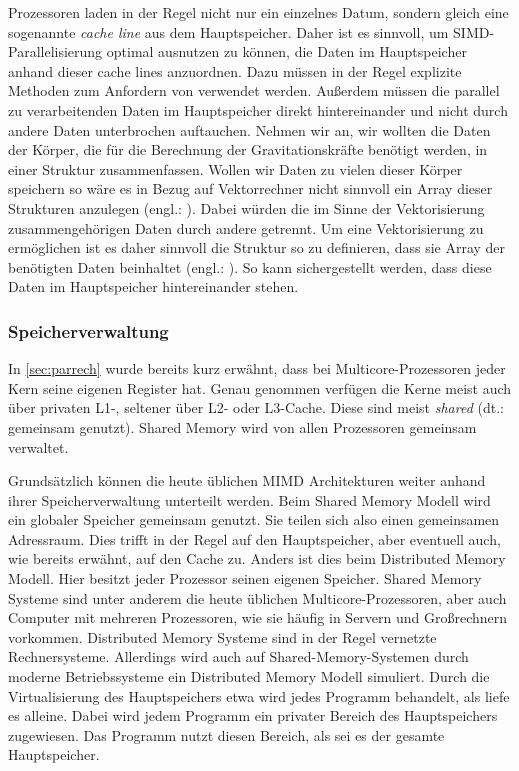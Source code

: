       Prozessoren laden in der Regel nicht nur ein einzelnes Datum, sondern gleich eine sogenannte  \textit{cache line} aus dem Hauptspeicher. Daher ist es sinnvoll, um SIMD-Parallelisierung 
      optimal ausnutzen zu können, die Daten im Hauptspeicher anhand dieser cache lines anzuordnen. Dazu müssen in der Regel explizite Methoden zum Anfordern von 
       verwendet werden. Außerdem müssen die parallel zu verarbeitenden Daten im Hauptspeicher direkt hintereinander und nicht durch andere Daten 
      unterbrochen auftauchen. Nehmen wir an, wir wollten die Daten der Körper, die für die Berechnung der Gravitationskräfte benötigt werden, in einer Struktur zusammenfassen. Wollen wir
      Daten zu vielen dieser Körper speichern so wäre es in Bezug auf Vektorrechner nicht sinnvoll ein Array dieser Strukturen anzulegen (engl.: ).
      Dabei würden die im Sinne der Vektorisierung zusammengehörigen Daten durch andere getrennt. Um eine Vektorisierung zu ermöglichen ist es daher sinnvoll die Struktur so zu definieren,
      dass sie Array der benötigten Daten beinhaltet (engl.: ). So kann sichergestellt werden, dass diese Daten im Hauptspeicher hintereinander stehen.
      
      
      \subsubsection{Speicherverwaltung}
      \label{sec:speicher}
	In \autoref{sec:parrech} wurde bereits kurz erwähnt, dass bei Multicore-Prozessoren jeder Kern seine eigenen Register hat. Genau genommen verfügen die Kerne meist auch über privaten L1-,
	seltener über L2- oder L3-Cache. Diese sind meist \textit{shared} (dt.: gemeinsam genutzt).
	Shared Memory wird von allen Prozessoren gemeinsam verwaltet.
	
	Grundsätzlich können die heute üblichen MIMD Architekturen weiter anhand ihrer Speicherverwaltung unterteilt werden. Beim Shared Memory Modell wird ein globaler
	Speicher gemeinsam genutzt. Sie teilen sich also einen gemeinsamen Adressraum. Dies trifft in der Regel auf den Hauptspeicher, aber eventuell auch, wie bereits erwähnt, auf den Cache zu.
	Anders ist dies beim Distributed Memory Modell. Hier besitzt jeder Prozessor seinen eigenen Speicher. Shared Memory Systeme sind unter anderem die heute üblichen Multicore-Prozessoren,
	aber auch Computer mit mehreren Prozessoren, wie sie häufig in Servern und Großrechnern vorkommen. Distributed Memory Systeme sind in der Regel vernetzte Rechnersysteme. Allerdings wird
	auch auf Shared-Memory-Systemen durch moderne Betriebssysteme ein Distributed Memory Modell simuliert. Durch die Virtualisierung des Hauptspeichers etwa wird jedes Programm behandelt,
	als liefe es alleine. Dabei wird jedem Programm ein privater Bereich des Hauptspeichers zugewiesen. Das Programm nutzt diesen Bereich, als sei es der gesamte Hauptspeicher. \citep{korbler}
	
